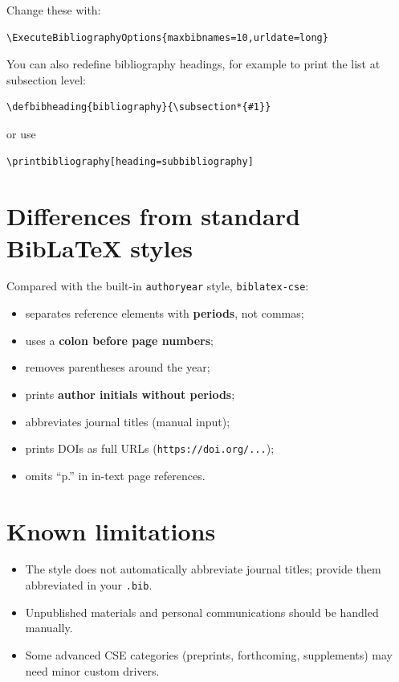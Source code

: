 \documentclass[11pt]{article}
\begin{document}
Change these with:
\begin{verbatim}
\ExecuteBibliographyOptions{maxbibnames=10,urldate=long}
\end{verbatim}

You can also redefine bibliography headings, for example to print the list at subsection level:
\begin{verbatim}
\defbibheading{bibliography}{\subsection*{#1}}
\end{verbatim}  
or use
\begin{verbatim}
\printbibliography[heading=subbibliography]
\end{verbatim}

\section{Differences from standard BibLaTeX styles}

Compared with the built-in \texttt{authoryear} style, \texttt{biblatex-cse}:

\begin{itemize}
  \item separates reference elements with \textbf{periods}, not commas;
  \item uses a \textbf{colon before page numbers};
  \item removes parentheses around the year;
  \item prints \textbf{author initials without periods};
  \item abbreviates journal titles (manual input);
  \item prints DOIs as full URLs (\texttt{https://doi.org/...});
  \item omits “p.” in in-text page references.
\end{itemize}

\section{Known limitations}

\begin{itemize}
  \item The style does not automatically abbreviate journal titles; provide them abbreviated in your \texttt{.bib}.
  \item Unpublished materials and personal communications should be handled manually.
  \item Some advanced CSE categories (preprints, forthcoming, supplements) may need minor custom drivers.
\end{itemize}
\end{document}
